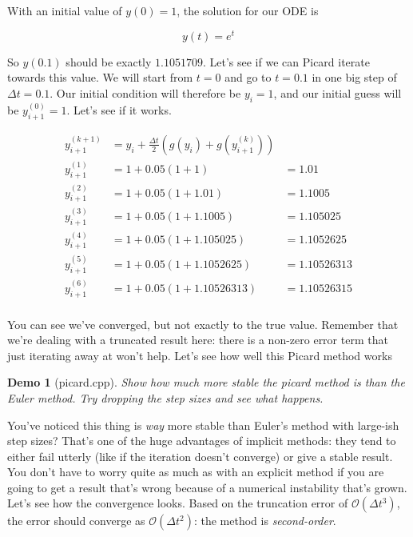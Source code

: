 \documentclass{article}
\theoremstyle{demo}
\newtheorem{demo}{Demo}[section]
\begin{document}
With an initial value of $y(0) = 1$, the solution for our ODE is

\begin{equation}
    y(t) = e^t
\end{equation}

So $y(0.1)$ should be exactly $1.1051709$.  Let's see if we can Picard iterate
towards this value.  We will start from $t=0$ and go to $t=0.1$ in one big step
of $\Delta t = 0.1$.  Our initial condition will therefore be $y_i=1$, and our
initial guess will be $y^{(0)}_{i+1}=1$.  Let's see if it works.

\begin{equation}
    \begin{aligned}
        y^{(k+1)}_{i+1} &= y_i + \frac{\Delta t}{2}(g(y_i)+g(y^{(k)}_{i+1})) \\
        y^{(1)}_{i+1} &= 1 + 0.05(1+1) &= 1.01 \\
        y^{(2)}_{i+1} &= 1 + 0.05(1+1.01) &= 1.1005 \\
        y^{(3)}_{i+1} &= 1 + 0.05(1+1.1005) &= 1.105025 \\
        y^{(4)}_{i+1} &= 1 + 0.05(1+1.105025) &= 1.1052625 \\
        y^{(5)}_{i+1} &= 1 + 0.05(1+1.1052625) &= 1.10526313 \\
        y^{(6)}_{i+1} &= 1 + 0.05(1+1.10526313) &= 1.10526315 \\
    \end{aligned}
\end{equation}

You can see we've converged, but not exactly to the true value.  Remember that
we're dealing with a truncated result here: there is a non-zero error term that
just iterating away at won't help.  Let's see how well this Picard method works

\begin{demo}[picard.cpp]
    Show how much more stable the picard method is than the Euler method.  Try
    dropping the step sizes and see what happens.
\end{demo}

You've noticed this thing is \textit{way} more stable than Euler's method with
large-ish step sizes?  That's one of the huge advantages of implicit methods:
they tend to either fail utterly (like if the iteration doesn't converge) or
give a stable result.  You don't have to worry quite as much as with an
explicit method if you are going to get a result that's wrong because of a
numerical instability that's grown.  Let's see how the convergence looks.  Based
on the truncation error of $\mathcal{O}(\Delta t^3)$, the error should converge
as $\mathcal{O}(\Delta t^2)$: the method is \textit{second-order}.
\end{document}
